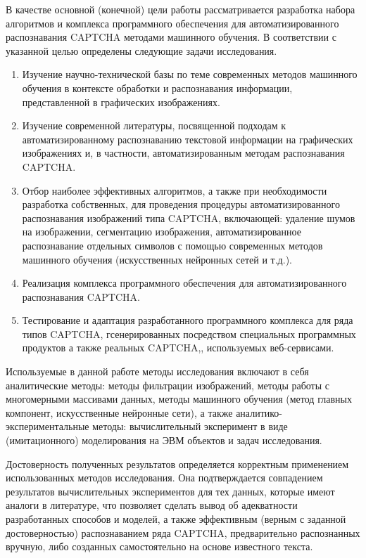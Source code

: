 \documentclass[a4paper,12pt,russian]{article} %
\begin{document}
В качестве основной (конечной) цели работы рассматривается разработка набора алгоритмов и комплекса программного обеспечения для автоматизированного распознавания CAPTCHA методами машинного обучения.
В соответствии с указанной целью определены следующие задачи исследования.
\begin{enumerate}
\item Изучение научно-технической базы по теме современных методов машинного обучения в контексте обработки и распознавания информации, представленной в графических изображениях.
\item Изучение современной литературы, посвященной подходам к автоматизированному распознаванию текстовой информации на графических изображениях и, в частности, автоматизированным методам распознавания CAPTCHA.
\item Отбор наиболее эффективных алгоритмов, а также при необходимости разработка собственных, для проведения процедуры автоматизированного распознавания изображений типа CAPTCHA, включающей: удаление шумов на изображении, сегментацию изображения, автоматизированное распознавание отдельных символов с помощью современных методов машинного обучения (искусственных нейронных сетей и т.д.).
\item Реализация комплекса программного обеспечения для автоматизированного распознавания CAPTCHA.
\item Тестирование и адаптация разработанного программного комплекса для ряда типов CAPTCHA, гсенерированных посредством специальных программных продуктов а также реальных CAPTCHA,, используемых веб-сервисами.
\end{enumerate}

Используемые в данной работе методы исследования включают в себя аналитические методы: методы фильтрации изображений, методы работы с многомерными массивами данных, методы машинного обучения (метод главных компонент, искусственные нейронные сети), а также
аналитико-экспериментальные методы: вычислительный эксперимент в виде (имитационного) моделирования на ЭВМ объектов и задач исследования.

Достоверность полученных результатов определяется корректным применением использованных методов исследования.
Она подтверждается совпадением результатов вычислительных экспериментов для тех данных, которые имеют аналоги в литературе, что позволяет сделать вывод об адекватности разработанных способов и моделей, а также эффективным (верным с заданной достоверностью) распознаванием ряда CAPTCHA, предварительно распознанных вручную, либо созданных самостоятельно на основе известного текста.
\end{document}
